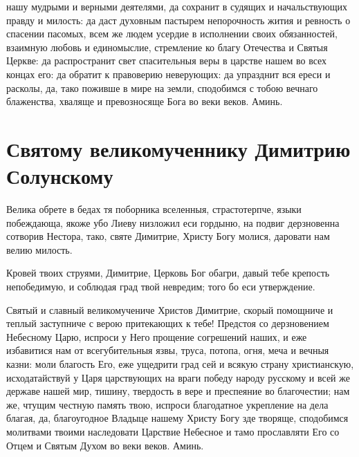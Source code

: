 \begin{mymulticols}
нашу мудрыми и верными деятелями, да сохранит в судящих и начальствующих правду и милость: да даст духовным пастырем непорочность жития и ревность о спасении пасомых, всем же людем усердие в исполнении своих обязанностей, взаимную любовь и единомыслие, стремление ко благу Отечества и Святыя Церкве: да распространит свет спасительныя веры в царстве нашем во всех концах его: да обратит к правоверию неверующих: да упразднит вся ереси и расколы, да, тако поживше в мире на земли, сподобимся с тобою вечнаго блаженства, хваляще и превозносяще Бога во веки веков. Аминь.

\end{mymulticols}

\section{Святому великомученнику Димитрию Солунскому}\begin{mymulticols}


Велика обрете в бедах тя поборника вселенныя, страстотерпче, языки побеждающа, якоже убо Лиеву низложил еси гордыню, на подвиг дерзновенна сотворив Нестора, тако, святе Димитрие, Христу Богу молися, даровати нам велию милость.


Кровей твоих струями, Димитрие, Церковь Бог обагри, давый тебе крепость непобедимую, и соблюдая град твой невредим; того бо еси утверждение.


Святый и славный великомучениче Христов Димитрие, скорый помощниче и теплый заступниче с верою притекающих к тебе! Предстоя со дерзновением Небесному Царю, испроси у Него прощение согрешений наших, и еже избавитися нам от всегубительныя язвы, труса, потопа, огня, меча и вечныя казни: моли благость Его, еже ущедрити град сей  и всякую страну христианскую, исходатайствуй у Царя царствующих на враги победу народу русскому и всей же державе нашей мир, тишину, твердость в вере и преспеяние во благочестии; нам же, чтущим честную память твою, испроси благодатное укрепление на дела благая, да, благоугодное Владыце нашему Христу Богу зде творяще, сподобимся молитвами твоими наследовати Царствие Небесное и тамо прославляти Его со Отцем и Святым Духом во веки веков. Аминь.

\end{mymulticols}

